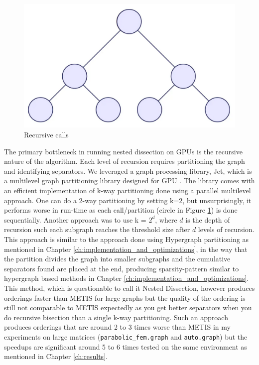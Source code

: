 \begin{figure}
\includegraphics[width=0.9\linewidth]{fig/background/nested_dissection.png} 
\caption{Recursive calls}
\label{fig:nd_res}
\end{figure}

The primary bottleneck in running nested dissection on GPUs is the recursive nature of the algorithm. Each level of recursion requires partitioning the graph and identifying separators. We leveraged a graph processing library, Jet, which is a multilevel graph partitioning library designed for GPU \cite{gilbert_jet_2024}. The library comes with an efficient implementation of k-way partitioning done using a parallel multilevel approach. One can do a 2-way partitioning by setting k=2, but unsurprisingly, it performs worse in run-time as each call/partition (circle in Figure \ref{fig:nd_res}) is done sequentially. Another approach was to use k = $2^d$, where $d$ is the depth of recursion such each subgraph reaches the threshold size after $d$ levels of recursion. This approach is similar to the approach done using Hypergraph partitioning as mentioned in Chapter \ref{ch:implementation_and_optimizations}, in the way that the partition
divides the graph into smaller subgraphs and the cumulative separators found are placed at the end, producing sparsity-pattern similar to hypergraph based methods in Chapter \ref{ch:implementation_and_optimizations}. This method, which is questionable to call it Nested Dissection, however produces orderings faster than METIS for large graphs but the quality of the ordering is still not comparable to METIS expectedly as you get better separators when you do recursive bisection than a single k-way partitioning. Such an approach produces orderings that are around 2 to 3 times worse than METIS in my experiments on large matrices (\texttt{parabolic_fem.graph} and \texttt{auto.graph}) but the speedups are significant around 5 to 6 times tested on the same environment as mentioned in Chapter \ref{ch:results}.
